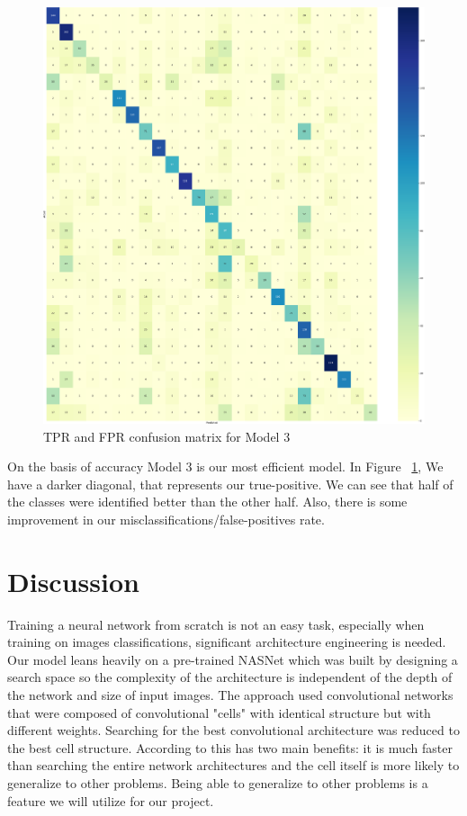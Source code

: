 \documentclass[conference]{IEEEtran}
\begin{document}
\FloatBarrier
\begin{figure}[!htbp]
\centerline
{\includegraphics[width=\columnwidth]{images/Conf_25-cropped.pdf}}
\caption{TPR and FPR confusion matrix for Model 3}
\label{fig:CM_25}
\end{figure}
On the basis of accuracy Model 3 is our most efficient model.
In Figure ~\ref{fig:CM_25}, We have a darker diagonal, that represents our true-positive. We can see that half of the classes were identified better than the other half. Also, there is some improvement in our misclassifications/false-positives rate. 

\section{Discussion}
Training a neural network from scratch is not an easy task, especially when training on images classifications, significant architecture engineering is needed. Our model leans heavily on a pre-trained NASNet which was built by designing a search space so the complexity of the architecture is independent of the depth of the network and size of input images\cite{zoph2017learning}. The approach used convolutional networks that were composed of convolutional "cells" with identical structure but with different weights. Searching for the best convolutional architecture was reduced to the best cell structure. According to \cite{zoph2017learning} this has two main benefits: it is much faster than searching the entire network architectures and the cell itself is more likely to generalize to other problems. Being able to generalize to other problems is a feature we will utilize for our project. 
\end{document}

